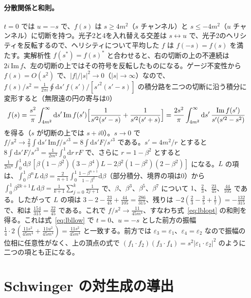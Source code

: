 \documentclass[a4paper,10pt]{ltjsarticle}
\newcommand{\dd}{\mathrm{d}}
\begin{document}
\paragraph{分散関係と和則。}$t=0$ では $u=-s$ で、$f(s)$ は $s\ge4m^2$（$s$ チャンネル）と $s\le-4m^2$（$u$ チャンネル）に切断を持つ。光子2と4を入れ替える交差は $s\leftrightarrow u$ で、光子2のヘリシティを反転するので、ヘリシティについて平均した $f$ は $f(-s)=f(s)$ を満たす。実解析性 $f(s^*)=f(s)^*$ と合わせると、右の切断の上の不連続は $2i\,\mathrm{Im}\,f$、左の切断の上ではその符号を反転したものになる。ゲージ不変性から $f(s)=O(s^2)$ で、$|f|/|s|^2\to0$（$|s|\to\infty$）なので、$f(s)/s^2=\frac{1}{2\pi i}\oint\dd s'\,f(s')/[s'^2(s'-s)]$ の積分路を二つの切断に沿う積分に変形すると（無限遠の円の寄与は0）
\begin{equation*}
f(s)=\frac{s^2}{\pi}\int_{4m^2}^\infty\dd s'\,\mathrm{Im}\,f(s')\Bigl[\frac{1}{s'^2(s'-s)}+\frac{1}{s'^2(s'+s)}\Bigr]=\frac{2s^2}{\pi}\int_{4m^2}^\infty\dd s'\,\frac{\mathrm{Im}\,f(s')}{s'(s'^2-s^2)}
\end{equation*}
を得る（$s$ が切断の上では $s+i0$）。$s\to0$ で $f/s^2\to\frac2\pi\int\dd s'\,\mathrm{Im}f/s'^3=8\int\dd s'F/s'^3$ である。$s'=4m^2/r$ とすると $8\int\dd s'F/s'^3=\frac{1}{2m^4}\int_0^1\dd r\,rF$ で、さらに $r=1-\beta^2$ とすると $\frac{1}{2m^4}\int_0^1\dd\beta\,[\beta(1-\beta^2)(3-\beta^4)L-2\beta^2(1-\beta^2)(2-\beta^2)]$ になる。$L$ の項は、$\int_0^1\beta^nL\,\dd\beta=\frac{2}{n+1}\int_0^1\frac{1-\beta^{n+1}}{1-\beta^2}\dd\beta$（部分積分、境界の項は0）から $\int_0^1\beta^{2k+1}L\,\dd\beta=\frac1{k+1}\sum_{j=0}^k\frac{1}{2j+1}$ で、$\beta$、$\beta^3$、$\beta^5$、$\beta^7$ について $1$、$\frac23$、$\frac{23}{45}$、$\frac{44}{105}$ である。したがって $L$ の項は $3-2-\frac{23}{45}+\frac{44}{105}=\frac{286}{315}$、残りは $-2(\frac23-\frac35+\frac17)=-\frac{132}{315}$ で、和は $\frac{154}{315}=\frac{22}{45}$ である。これで $f/s^2\to\frac{11}{45m^4}$、すなわち式~\eqref{eq:lblopt} の和則を得る。これは式~\eqref{eq:lbllow} で $t=0$、$u=-s$ とした前方の振幅 $\frac14\cdot2\,(\frac{11s^2}{45m^4}+\frac{11u^2}{45m^4})=\frac{11s^2}{45m^4}$ と一致する。前方では $\varepsilon_3=\varepsilon_1$、$\varepsilon_4=\varepsilon_2$ なので振幅の位相に任意性がなく、上の頂点の式で $(f_1\cdot f_2)(f_3\cdot f_4)=s^2|\varepsilon_1\cdot\varepsilon_2|^2$ のように二つの項とも正になる。

\section{Schwinger の対生成の導出}\label{app:schw}
\end{document}

